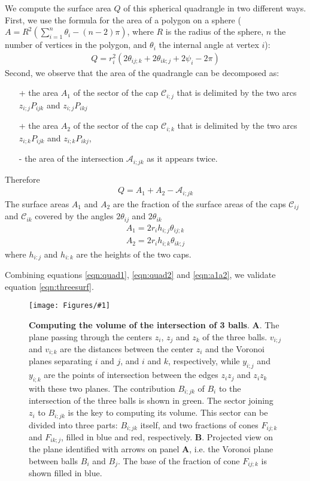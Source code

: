 \documentclass[11 pt]{article}
\theoremstyle{plain} \theorembodyfont{\rmfamily}
\newcommand{\centerfig}[2]{%
\centerline{\texttt{[image: Figures/\#1]}}
}
\begin{document}
We compute the surface area $Q$ of this spherical quadrangle in two different ways.
First, we use the formula for the area of a polygon on a sphere ($\displaystyle A=R^2 \left(\sum_{i=1}^n \theta_i -(n-2)\pi\right)$, where $R$ is the radius of the sphere, $n$ the number of vertices in the polygon, and $\theta_i$ the internal angle at vertex $i$):
\begin{eqnarray}
Q = r_i^2(2 \theta_{ij;k} + 2\theta_{ik;j} + 2\psi_{i} - 2\pi)
\label{eqn:quad1}
\end{eqnarray}
Second, we observe that the area of the quadrangle can be decomposed as:
\begin{itemize}
\item [+] the area $A_1$ of the sector of the cap $\mathcal{C}_{i;j}$ that is delimited by the two arcs $z_{i;j}P_{ijk}$ and $z_{i;j}P_{ikj}$
\item [+] the area $A_2$ of the sector of the cap $\mathcal{C}_{i;k}$ that is delimited by the two arcs $z_{i;k}P_{ijk}$ and $z_{i;k}P_{ikj}$, 
\item [-]  the area of the intersection $\mathcal{A}_{i;jk}$ as it appears twice.
\end{itemize}
Therefore
\begin{eqnarray}
Q = A_1 + A_2 - \mathcal{A}_{i;jk}
\label{eqn:quad2}
\end{eqnarray}
The surface areas $A_1$ and $A_2$ are the fraction of the surface areas of the caps $\mathcal{C}_{ij}$ and $\mathcal{C}_{ik}$ covered by the angles $2\theta_{ij}$ and $2\theta_{ik}$
\begin{eqnarray}
A_1 =  2 r_i h_{i;j} \theta_{ij;k} \nonumber  \\
A_2 = 2 r_i h_{i;k} \theta_{ik;j}
\label{eqn:a1a2}
\end{eqnarray}
where $h_{i:j}$ and $h_{i:k}$ are the heights of the two caps.

Combining equations \ref{eqn:quad1}, \ref{eqn:quad2} and \ref{eqn:a1a2}, we validate equation \ref{eqn:threesurf}.

\begin{figure}[hbt]
	\centerfig{ThreeBall1}{width=4.5in}
\caption{ \textbf{Computing the volume of the intersection of 3 balls}. \textbf {A}. The plane passing through
	the centers $z_i$, $z_j$ and $z_k$ of the three balls.
	$v_{i;j}$ and $v_{i;k}$ are the distances between the center $z_i$ and the Voronoi planes
	separating $i$ and $j$, and $i$ and $k$, respectively, while $y_{i;j}$ and $y_{i;k}$ are the points of intersection between the edges $z_i z_j$ and $z_i z_k$ with these two planes.  The contribution $B_{i;jk}$ of $B_i$ to the intersection of the three balls is shown in green.  The sector joining $z_i$ to $B_{i;jk}$ is the key to computing its volume.
	This sector can be divided into three parts: $B_{i;jk}$ itself, and two fractions of cones $F_{ij;k}$ and $F_{ik;j}$, filled in blue and red, respectively.
	\textbf{B}. Projected view on the plane identified with arrows on panel \textbf{A}, i.e. the Voronoi plane
	between balls $B_i$ and $B_j$.  The base of the fraction of cone $F_{ij;k}$ is shown filled in blue. }
	\label{fig:threeball}
\end{figure}
\end{document}
